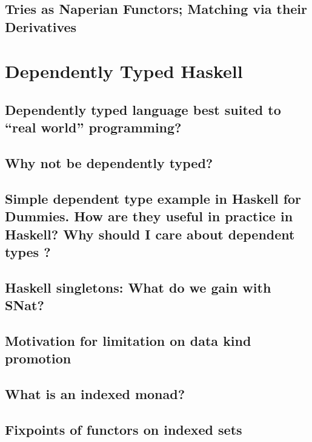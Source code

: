 \documentclass{book}%
\begin{document}
\section{Tries as Naperian Functors; Matching via their Derivatives}



\chapter{Dependently Typed Haskell}

\section{Dependently typed language best suited to “real world” programming?}


\section{Why not be dependently typed?}


\section{Simple dependent type example in Haskell for Dummies. How are they useful in practice in Haskell? Why should I care about dependent types ?}


\section{Haskell singletons: What do we gain with SNat?}


\section{Motivation for limitation on data kind promotion}


\section{What is an indexed monad?}


\section{Fixpoints of functors on indexed sets}

\end{document}
